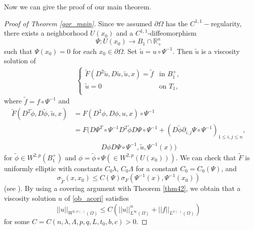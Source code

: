 \documentclass[11pt, reqno]{amsart}
\numberwithin{equation}{section}
\begin{document}
Now we can give the proof of our main theorem.
\begin{proof}[Proof of Theorem \ref{gor_main}] 

Since we assumed $ \partial \Omega $ has the $C^{1,1}-$regularity, there exists a neighborhood $U(x_{0}) $ and a $ C^{1,1}$-diffeomorphism
$$ \Psi : U(x_{0}) \to B_{1}  \cap \mathbb{R}_{+}^{n} $$
such that $ \Psi(x_{0}) = 0$  for each $ x_{0} \in \partial \Omega $.
Set  $ \tilde{u} =  u \circ \Psi^{-1}$. Then $\tilde{u} $ is a viscosity solution of
 \begin{align*}
\left\{ \begin{array}{ll}
\tilde{F}(D^{2}\tilde{u},D\tilde{u},\tilde{u},x)=\tilde{f} & \textrm{in $B_{1}^{+}$,}\\
\tilde{u} = 0 & \textrm{on $T_{1}$,}\\
\end{array} \right.
\end{align*}
where $ \tilde{f} = f \circ \Psi^{-1}$ and
\begin{align*}
\tilde{F}(D^{2}\tilde{\phi},D\tilde{\phi},\tilde{u},x) &
=F (D^{2}\phi, D\phi, u ,x) \circ \Psi^{-1} \\ &
= F(D \Psi^{T} \circ \Psi^{-1} D^{2} \tilde{\phi} D\Psi \circ \Psi^{-1} + (D \tilde{\phi} \partial_{i,j} \Psi \circ \Psi^{-1})_{1\le i,j \le n} , \\ & \qquad  \qquad
D\phi D \Psi \circ \Psi^{-1}, \tilde{u} , \Psi^{-1}(x))
\end{align*}
for $ \tilde{\phi} \in W^{2,p}(B_{1}^{+} )$ and $ \phi = \tilde{\phi} \circ \Psi ( \in W^{2,p}(U(x_{0})))$.
We can check that $\tilde{F}$ is uniformly elliptic with constants $C_{0}\lambda  $, $C_{0} \Lambda $
for a constant $ C_{0}= C_{0}(\Psi)$, and
$$ \sigma_{\tilde{F}}(x,x_{0}) \le C(\Psi) \sigma_{F}(\Psi^{-1}(x),\Psi^{-1}(x_{0}))$$
(see \cite{MR2486925}).
By using a covering argument with Theorem \ref{thm42}, we obtain that a viscosity solution $u$ of \eqref{ob_acori} satisfies
$$ ||u||_{ W^{2, \psi(\cdot)}(\Omega)} \le C(||u||_{ L^{\infty}(\Omega)}^n+||f||_{ L^{\psi(\cdot)}(\Omega)})$$
for some $C=C(n, \lambda, \Lambda, p,q ,L,t_{0},b,c)>0 $.



\end{proof}
\end{document}

